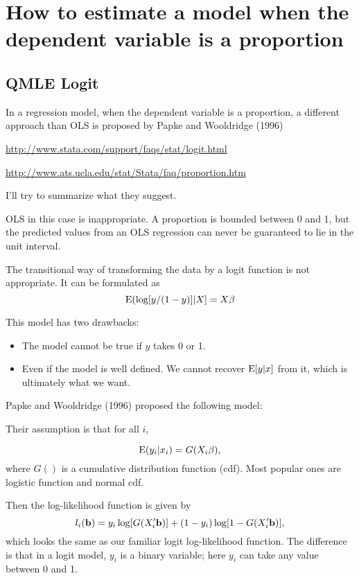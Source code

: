 \chapter{How to estimate a model when the dependent variable is a proportion}

\section{QMLE Logit}

In a regression model, when the dependent variable is a proportion, a different approach than OLS is proposed by Papke and Wooldridge (1996)

\url{http://www.stata.com/support/faqs/stat/logit.html}

\url{http://www.ats.ucla.edu/stat/Stata/faq/proportion.htm}



I'll try to summarize what they suggest.

OLS in this case is inappropriate.  A proportion is bounded between 0 and 1, but the predicted values from an OLS regression can never be guaranteed to lie in the unit interval.

The transitional way of transforming the data by a logit function is not appropriate.  It can be formulated as 
\[ {\rm E} ({ \rm log} [y/(1-y)] | X ]= X \beta \]

This model has two drawbacks:

\begin{itemize}
\item The model cannot be true if $y$ takes 0 or 1.
\item Even if the model is well defined.  We cannot recover $ {\rm E} [ y | x] $ from it, which is ultimately what we want.
\end{itemize}


Papke and Wooldridge (1996) proposed the following model:

Their assumption is that for all $i$,

\begin{equation}
{\rm E} (y_i | x_i) = G(X_i \beta), 
\label{eq1}
\end{equation}
where $G()$ is a cumulative distribution function (cdf).  Most popular ones are logistic function and normal cdf.

Then the log-likelihood function is given by 
\begin{equation}
 l_i({\bf b}) = y_i \log [ G(X_i' {\bf b})] + (1- y_i) \log [ 1- G(X_i' {\bf b})], 
\label{eq2}
\end{equation}
which looks the same as our familiar logit log-likelihood function.  The difference is that in a logit model, $y_i$ is a binary variable; here $y_i$ can take any value between 0 and 1.  

